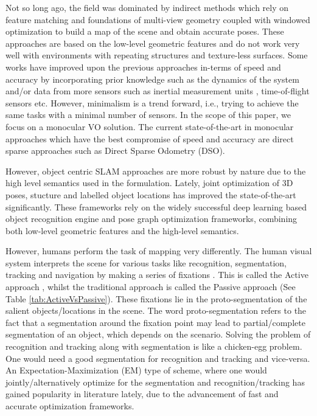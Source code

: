 \documentclass[letterpaper, 10 pt, conference]{ieeeconf}  %
\begin{document}
Not so long ago, the field was dominated by indirect methods \cite{monoslam, PTAM, ORBSLAM, stuhmer2010real} which rely on feature matching and foundations of multi-view geometry coupled with windowed optimization to build a map of the scene and obtain accurate poses. These approaches are based on the low-level geometric features and do not work very well with environments with repeating structures and texture-less surfaces. Some works have improved upon the previous approaches in-terms of speed and accuracy by incorporating prior knowledge such as the dynamics of the system and/or data from more sensors such as inertial measurement units \cite{ROVIO}, time-of-flight sensors \cite{RGBDSLAM} etc. However, minimalism is a trend forward, i.e., trying to achieve the same tasks with a minimal number of sensors. In the scope of this paper, we focus on a monocular VO solution. The current state-of-the-art in monocular approaches which have the best compromise of speed and accuracy are direct sparse approaches such as Direct Sparse Odometry (DSO)\cite{DSO}.

However, object centric SLAM approaches are more robust by nature due to the high level semantics used in the formulation. Lately, joint optimization of 3D poses, stucture and labelled object locations has improved the state-of-the-art significantly. These frameworks rely on the widely successful deep learning based object recognition engine and pose graph optimization frameworks, combining both low-level geometric features and the high-level semantics.

However, humans perform the task of mapping very differently. The human visual system interprets the scene for various tasks like recognition, segmentation, tracking and navigation by making a series of fixations \cite{YiannisFixation}. This is called the Active approach \cite{ActiveVision, SukhtameActive, BajcsyActive}, whilst the traditional approach is called the Passive approach (See Table \ref{tab:ActiveVsPassive}). These fixations lie in the proto-segmentation of the salient objects/locations in the scene. The word proto-segmentation refers to the fact that a segmentation around the fixation point may lead to partial/complete segmentation of an object, which depends on the scenario. Solving the problem of recognition and tracking along with segmentation is like a chicken-egg problem. One would need a good segmentation for recognition and tracking and vice-versa. An Expectation-Maximization (EM) type of scheme, where one would jointly/alternatively optimize for the segmentation and recognition/tracking has gained popularity in literature lately, due to the advancement of fast and accurate optimization frameworks.
\end{document}
